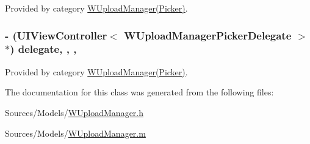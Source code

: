 Provided by category \hyperlink{category_w_upload_manager_07_picker_08_a30094622f4a5143ba72ea9fa61c1d7cf}{W\-Upload\-Manager(\-Picker)}.

\hypertarget{interface_w_upload_manager_a870f35ee39fa92fd49939ea31777bada}{
\subsubsection[{delegate}]{\setlength{\rightskip}{0pt plus 5cm}-\/ (U\-I\-View\-Controller$<$ {\bf W\-Upload\-Manager\-Picker\-Delegate} $>$ $\ast$) delegate\hspace{0.3cm}{\ttfamily [read]}, {\ttfamily [write]}, {\ttfamily [nonatomic]}, {\ttfamily [retain]}}}\label{interface_w_upload_manager_a870f35ee39fa92fd49939ea31777bada}


Provided by category \hyperlink{category_w_upload_manager_07_picker_08_a870f35ee39fa92fd49939ea31777bada}{W\-Upload\-Manager(\-Picker)}.



The documentation for this class was generated from the following files\-:\begin{DoxyCompactItemize}
\item 
Sources/\-Models/\hyperlink{_w_upload_manager_8h}{W\-Upload\-Manager.\-h}\item 
Sources/\-Models/\hyperlink{_w_upload_manager_8m}{W\-Upload\-Manager.\-m}\end{DoxyCompactItemize}
